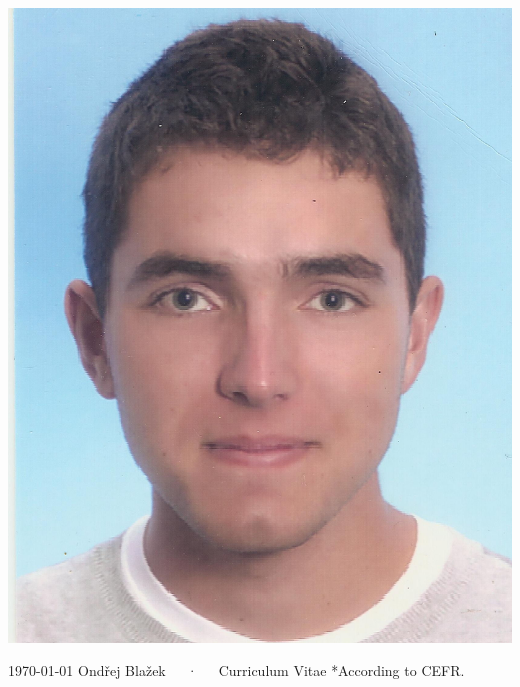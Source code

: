 \documentclass[11pt, a4paper]{awesome-cv}
\begin{document}
\makecvheader

  \begin{center}
  \includegraphics[scale=0.5]{OndrejBlazek.jpg} 
  \end{center}
\makecvfooter
  {\today}
  {Ondřej Blažek~~~·~~~Curriculum Vitae}
  {*According to CEFR.}




%


%
%
%
%


\end{document}
